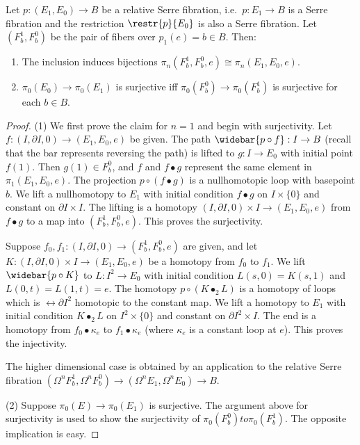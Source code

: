 \begin{prop}\label{prop 6.3.8 tomDieck}
    Let $p:(E_1,E_0)\to B$ be a relative Serre fibration, i.e.\ $p:E_1\to B$ is a Serre fibration and the restriction $\restr{p}{E_0}$ is also a Serre fibration. Let $(F^1_b,F^0_b)$ be the pair of fibers over $p_1(e)=b\in B$. Then:
    \begin{enumerate}
        \item The inclusion induces bijections $\pi_n(F_b^1,F_b^0,e)\cong\pi_n(E_1,E_0,e)$.
        \item $\pi_0(E_0)\to \pi_0(E_1)$ is surjective iff $\pi_0(F_b^0)\to \pi_0(F_b^1)$ is surjective for each $b\in B$.
    \end{enumerate}
\end{prop}
\begin{proof}
    (1) We first prove the claim for $n=1$ and begin with surjectivity. Let $f:(I,\partial I,0)\to (E_1,E_0,e)$ be given. The path $\widebar{p\circ f}:I\to B$ (recall that the bar represents reversing the path) is lifted to $g:I\to E_0$ with initial point $f(1)$. Then $g(1)\in F^0_b$, and $f$ and $f\bullet g$ represent the same element in $\pi_1(E_1,E_0,e)$. The projection $p\circ(f\bullet g)$ is a nullhomotopic loop with basepoint $b$. We lift a nullhomotopy to $E_1$ with initial condition $f\bullet g$ on $I\times\{0\}$ and constant on $\partial I\times I$. The lifting is a homotopy $(I,\partial I,0)\times I\to (E_1,E_0,e)$ from $f\bullet g$ to a map into $(F^1_b,F^0_b,e)$. This proves the surjectivity.

    Suppose $f_0,f_1:(I,\partial I,0)\to (F^1_b,F^0_b,e)$ are given, and let $K:(I,\partial I,0)\times I\to (E_1,E_0,e)$ be a homotopy from $f_0$ to $f_1$. We lift $\widebar{p\circ K}$ to $L:I^2\to E_0$ with initial condition $L(s,0)=K(s,1)$ and $L(0,t)=L(1,t)=e$. The homotopy $p\circ(K\bullet_2 L)$ is a homotopy of loops which is $\rel \partial I^2$ homotopic to the constant map. We lift a homotopy to $E_1$ with initial condition $K\bullet_2 L$ on $I^2\times\{0\}$ and constant on $\partial I^2\times I$. The end is a homotopy from $f_0\bullet \kappa_e$ to $f_1\bullet\kappa_e$ (where $\kappa_e$ is a constant loop at $e$). This proves the injectivity.

    The higher dimensional case is obtained by an application to the relative Serre fibration $(\Omega^n F^1_b,\Omega^n F^0_b)\to (\Omega^n E_1,\Omega^nE_0)\to B$.

    (2) Suppose $\pi_0(E)\to \pi_0(E_1)$ is surjective. The argument above for surjectivity is used to show the surjectivity of $\pi_0(F^0_b)
    to \pi_0(F^1_b)$. The opposite implication is easy.
\end{proof}





